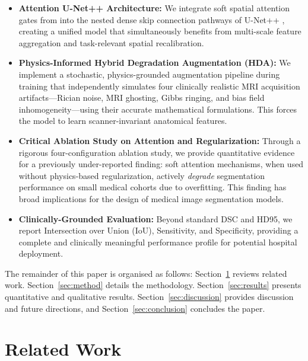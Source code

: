 \documentclass[conference]{IEEEtran}
\begin{document}
\begin{itemize}
    \item \textbf{Attention U-Net++ Architecture:} We integrate soft spatial attention gates from \cite{oktay2018attention} into the nested dense skip connection pathways of U-Net++ \cite{zhou2018unet++}, creating a unified model that simultaneously benefits from multi-scale feature aggregation and task-relevant spatial recalibration.

    \item \textbf{Physics-Informed Hybrid Degradation Augmentation (HDA):} We implement a stochastic, physics-grounded augmentation pipeline during training that independently simulates four clinically realistic MRI acquisition artifacts—Rician noise, MRI ghosting, Gibbs ringing, and bias field inhomogeneity—using their accurate mathematical formulations. This forces the model to learn scanner-invariant anatomical features.

    \item \textbf{Critical Ablation Study on Attention and Regularization:} Through a rigorous four-configuration ablation study, we provide quantitative evidence for a previously under-reported finding: soft attention mechanisms, when used without physics-based regularization, actively \textit{degrade} segmentation performance on small medical cohorts due to overfitting. This finding has broad implications for the design of medical image segmentation models.

    \item \textbf{Clinically-Grounded Evaluation:} Beyond standard DSC and HD95, we report Intersection over Union (IoU), Sensitivity, and Specificity, providing a complete and clinically meaningful performance profile for potential hospital deployment.
\end{itemize}

The remainder of this paper is organised as follows: Section~\ref{sec:related} reviews related work. Section~\ref{sec:method} details the methodology. Section~\ref{sec:results} presents quantitative and qualitative results. Section~\ref{sec:discussion} provides discussion and future directions, and Section~\ref{sec:conclusion} concludes the paper.

\section{Related Work}
\label{sec:related}
\end{document}
